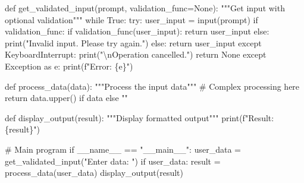 \documentclass[
  letterpaper,
  DIV=11,
  numbers=noendperiod,
  oneside]{scrreprt}
\newenvironment{Shaded}{}{}
\newcommand{\BuiltInTok}[1]{\textcolor[rgb]{0.84,0.23,0.29}{#1}}
\newcommand{\CharTok}[1]{\textcolor[rgb]{0.01,0.18,0.38}{#1}}
\newcommand{\CommentTok}[1]{\textcolor[rgb]{0.42,0.45,0.49}{#1}}
\newcommand{\ControlFlowTok}[1]{\textcolor[rgb]{0.84,0.23,0.29}{#1}}
\newcommand{\ImportTok}[1]{\textcolor[rgb]{0.01,0.18,0.38}{#1}}
\newcommand{\KeywordTok}[1]{\textcolor[rgb]{0.84,0.23,0.29}{#1}}
\newcommand{\NormalTok}[1]{\textcolor[rgb]{0.14,0.16,0.18}{#1}}
\newcommand{\OperatorTok}[1]{\textcolor[rgb]{0.14,0.16,0.18}{#1}}
\newcommand{\PreprocessorTok}[1]{\textcolor[rgb]{0.84,0.23,0.29}{#1}}
\newcommand{\SpecialCharTok}[1]{\textcolor[rgb]{0.00,0.36,0.77}{#1}}
\newcommand{\SpecialStringTok}[1]{\textcolor[rgb]{0.01,0.18,0.38}{#1}}
\newcommand{\StringTok}[1]{\textcolor[rgb]{0.01,0.18,0.38}{#1}}
\newcommand{\VariableTok}[1]{\textcolor[rgb]{0.89,0.38,0.04}{#1}}
\begin{document}
\begin{Shaded}
\begin{Highlighting}[]
\KeywordTok{def}\NormalTok{ get\_validated\_input(prompt, validation\_func}\OperatorTok{=}\VariableTok{None}\NormalTok{):}
    \CommentTok{"""Get input with optional validation"""}
    \ControlFlowTok{while} \VariableTok{True}\NormalTok{:}
        \ControlFlowTok{try}\NormalTok{:}
\NormalTok{            user\_input }\OperatorTok{=} \BuiltInTok{input}\NormalTok{(prompt)}
            \ControlFlowTok{if}\NormalTok{ validation\_func:}
                \ControlFlowTok{if}\NormalTok{ validation\_func(user\_input):}
                    \ControlFlowTok{return}\NormalTok{ user\_input}
                \ControlFlowTok{else}\NormalTok{:}
                    \BuiltInTok{print}\NormalTok{(}\StringTok{"Invalid input. Please try again."}\NormalTok{)}
            \ControlFlowTok{else}\NormalTok{:}
                \ControlFlowTok{return}\NormalTok{ user\_input}
        \ControlFlowTok{except} \PreprocessorTok{KeyboardInterrupt}\NormalTok{:}
            \BuiltInTok{print}\NormalTok{(}\StringTok{"}\CharTok{\textbackslash{}n}\StringTok{Operation cancelled."}\NormalTok{)}
            \ControlFlowTok{return} \VariableTok{None}
        \ControlFlowTok{except} \PreprocessorTok{Exception} \ImportTok{as}\NormalTok{ e:}
            \BuiltInTok{print}\NormalTok{(}\SpecialStringTok{f"Error: }\SpecialCharTok{\{}\NormalTok{e}\SpecialCharTok{\}}\SpecialStringTok{"}\NormalTok{)}

\KeywordTok{def}\NormalTok{ process\_data(data):}
    \CommentTok{"""Process the input data"""}
    \CommentTok{\# Complex processing here}
    \ControlFlowTok{return}\NormalTok{ data.upper() }\ControlFlowTok{if}\NormalTok{ data }\ControlFlowTok{else} \StringTok{""}

\KeywordTok{def}\NormalTok{ display\_output(result):}
    \CommentTok{"""Display formatted output"""}
    \BuiltInTok{print}\NormalTok{(}\SpecialStringTok{f"Result: }\SpecialCharTok{\{}\NormalTok{result}\SpecialCharTok{\}}\SpecialStringTok{"}\NormalTok{)}
    
\CommentTok{\# Main program}
\ControlFlowTok{if} \VariableTok{\_\_name\_\_} \OperatorTok{==} \StringTok{"\_\_main\_\_"}\NormalTok{:}
\NormalTok{    user\_data }\OperatorTok{=}\NormalTok{ get\_validated\_input(}\StringTok{"Enter data: "}\NormalTok{)}
    \ControlFlowTok{if}\NormalTok{ user\_data:}
\NormalTok{        result }\OperatorTok{=}\NormalTok{ process\_data(user\_data)}
\NormalTok{        display\_output(result)}
\end{Highlighting}
\end{Shaded}
\end{document}

